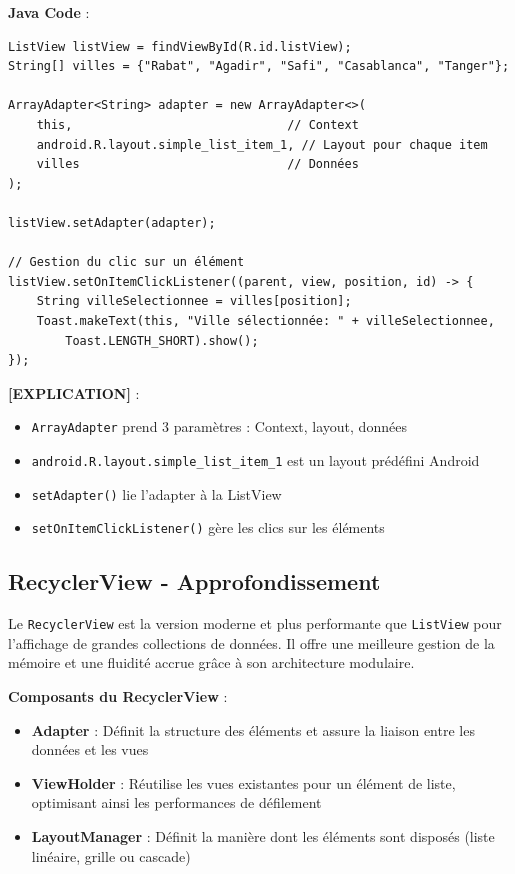 \documentclass[11pt,a4paper]{article}
\begin{document}
\textbf{Java Code} :
\begin{lstlisting}
ListView listView = findViewById(R.id.listView);
String[] villes = {"Rabat", "Agadir", "Safi", "Casablanca", "Tanger"};

ArrayAdapter<String> adapter = new ArrayAdapter<>(
    this,                              // Context
    android.R.layout.simple_list_item_1, // Layout pour chaque item
    villes                             // Données
);

listView.setAdapter(adapter);

// Gestion du clic sur un élément
listView.setOnItemClickListener((parent, view, position, id) -> {
    String villeSelectionnee = villes[position];
    Toast.makeText(this, "Ville sélectionnée: " + villeSelectionnee, 
        Toast.LENGTH_SHORT).show();
});
\end{lstlisting}

\textbf{[EXPLICATION]} :
\begin{itemize}
    \item \texttt{ArrayAdapter} prend 3 paramètres : Context, layout, données
    \item \texttt{android.R.layout.simple\_list\_item\_1} est un layout prédéfini Android
    \item \texttt{setAdapter()} lie l'adapter à la ListView
    \item \texttt{setOnItemClickListener()} gère les clics sur les éléments
\end{itemize}

\subsection{RecyclerView - Approfondissement}

Le \texttt{RecyclerView} est la version moderne et plus performante que \texttt{ListView} pour l'affichage de grandes collections de données. Il offre une meilleure gestion de la mémoire et une fluidité accrue grâce à son architecture modulaire.

\textbf{Composants du RecyclerView} :
\begin{itemize}
    \item \textbf{Adapter} : Définit la structure des éléments et assure la liaison entre les données et les vues
    \item \textbf{ViewHolder} : Réutilise les vues existantes pour un élément de liste, optimisant ainsi les performances de défilement
    \item \textbf{LayoutManager} : Définit la manière dont les éléments sont disposés (liste linéaire, grille ou cascade)
\end{itemize}
\end{document}
